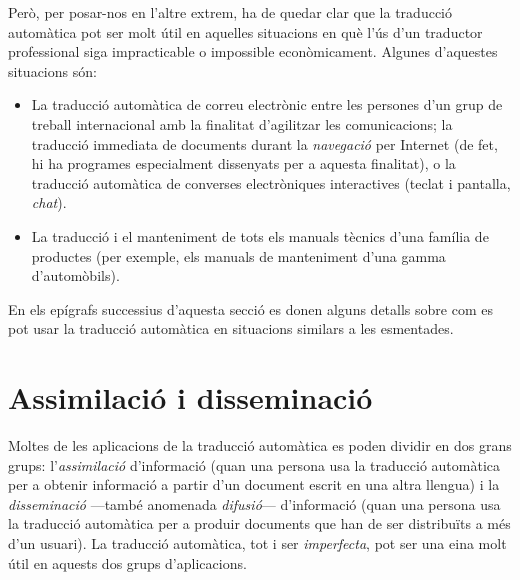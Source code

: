 Però, per posar-nos en l'altre extrem, 
ha de quedar clar que la traducció
automàtica pot ser molt útil en aquelles situacions en què
l'ús d'un traductor professional siga impracticable o impossible
econòmicament. Algunes d'aquestes situacions són:
\begin{itemize}
\item La traducció automàtica de correu electrònic entre les persones
d'un grup de treball internacional amb la finalitat d'agilitzar les
comunicacions; la traducció immediata de documents durant la
\emph{navegació} per Internet (de fet, hi ha programes especialment
dissenyats per a aquesta finalitat), o 
la traducció automàtica de converses electròniques interactives
(teclat i pantalla, \emph{chat}).
\item La traducció i el manteniment de tots els manuals tècnics
d'una família de productes (per exemple, els manuals de manteniment
d'una gamma d'automòbils).
\end{itemize}
En els epígrafs successius d'aquesta secció es donen alguns detalls sobre
com es pot usar la traducció automàtica en situacions
similars a les esmentades.

\section{Assimilació i disseminació} 

Moltes de les aplicacions de la traducció automàtica es poden dividir
en dos grans grups: l'\emph{assimilació} d'informació (quan una persona
usa la traducció automàtica per a obtenir informació a partir d'un
document escrit en una altra llengua) i la \emph{disseminació} ---també
anomenada \emph{difusió}--- d'informació (quan una persona usa la
traducció automàtica per a produir documents que han de ser
distribuïts a més d'un usuari).  La traducció automàtica, tot i ser
\emph{imperfecta}, pot ser una eina molt útil en aquests dos grups
d'aplicacions.

